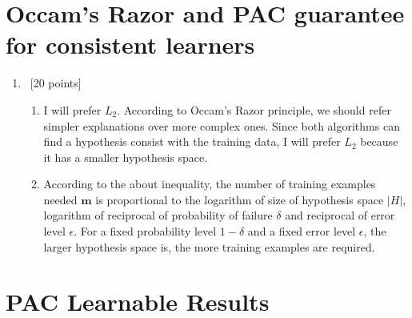 \documentclass[12pt, fullpage,letterpaper]{article}
\begin{document}
\section{Occam's Razor and PAC guarantee for consistent learners}

\begin{enumerate}
\item~[20 points] 
\begin{enumerate}
\item I will prefer $L_2$. According to Occam's Razor principle, we should refer simpler explanations over more complex ones. Since both algorithms can find a hypothesis consist with the training data, I will prefer $L_2$ because it has a smaller hypothesis space.
\item According to the about inequality, the number of training examples needed $\mathbf{m}$ is proportional to the logarithm of size of hypothesis space $|H|$, logarithm of reciprocal of probability of failure $\delta$ and reciprocal of error level $\epsilon$. For a fixed probability level $1-\delta$ and a fixed error level $\epsilon$, the larger hypothesis space is, the more training examples are required.
\end{enumerate}
\end{enumerate}

\section{PAC Learnable Results}
\end{document}
